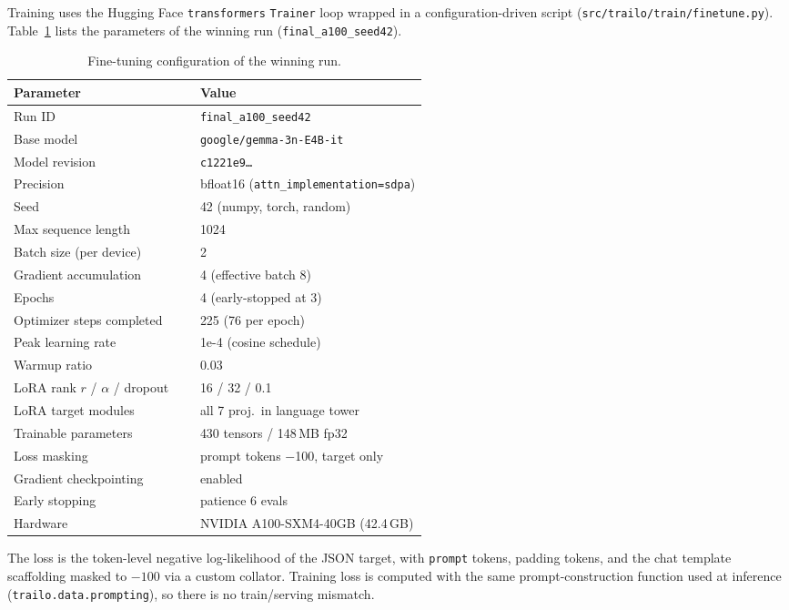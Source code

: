 \documentclass[conference]{IEEEtran}
\newcommand{\code}[1]{\texttt{\small #1}}
\newcommand{\modelname}{\texttt{google/gemma-3n-E4B-it}}
\begin{document}
Training uses the Hugging Face \code{transformers} \code{Trainer}
loop wrapped in a configuration-driven script
(\code{src/trailo/train/finetune.py}). Table~\ref{tab:train}
lists the parameters of the winning run
(\code{final\_a100\_seed42}).

\begin{table}[t]
\caption{Fine-tuning configuration of the winning run.}
\label{tab:train}
\centering
\small
\setlength{\tabcolsep}{5pt}
\begin{tabular*}{\columnwidth}{@{\extracolsep{\fill}}l p{0.55\linewidth}}
\toprule
\textbf{Parameter} & \textbf{Value} \\
\midrule
Run ID & \code{final\_a100\_seed42} \\
Base model & \modelname{} \\
Model revision & \code{c1221e9\dots} \\
Precision & bfloat16 (\code{attn\_implementation=sdpa}) \\
Seed & 42 (numpy, torch, random) \\
Max sequence length & 1024 \\
Batch size (per device) & 2 \\
Gradient accumulation & 4 (effective batch 8) \\
Epochs & 4 (early-stopped at 3) \\
Optimizer steps completed & 225 (76 per epoch) \\
Peak learning rate & 1e-4 (cosine schedule) \\
Warmup ratio & 0.03 \\
LoRA rank $r$ / $\alpha$ / dropout & 16 / 32 / 0.1 \\
LoRA target modules & all 7 proj.\ in language tower \\
Trainable parameters & 430 tensors / 148\,MB fp32 \\
Loss masking & prompt tokens $-$100, target only \\
Gradient checkpointing & enabled \\
Early stopping & patience 6 evals \\
Hardware & NVIDIA A100-SXM4-40GB (42.4\,GB) \\
\bottomrule
\end{tabular*}
\end{table}

The loss is the token-level negative log-likelihood of the JSON
target, with \code{prompt} tokens, padding tokens, and the chat
template scaffolding masked to $-100$ via a custom collator.
Training loss is computed with the same prompt-construction
function used at inference (\code{trailo.data.prompting}), so
there is no train/serving mismatch.
\end{document}
